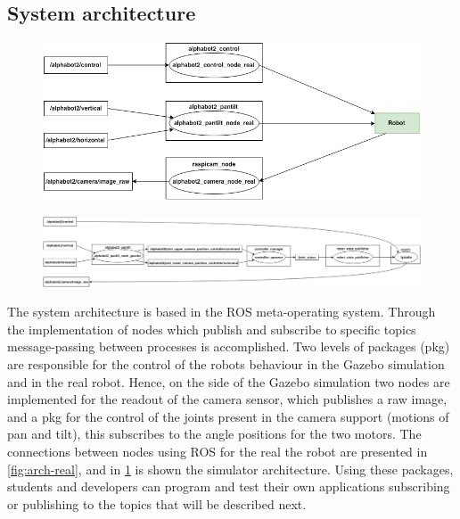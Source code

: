 \documentclass[conference]{IEEEtran}
\begin{document}
\subsection{System architecture} \label{subsec:system_arch}
\begin{figure}
\centering
\begin{minipage}{\linewidth}
  \centering
  \includegraphics[width=0.7\linewidth]{arch-real.png}
  \label{fig:arch-real}
\end{minipage}\newline
\begin{minipage}{\linewidth}
  \centering
  \includegraphics[width=\linewidth]{arch-gazebo.png}
  \label{fig:arch-gazebo}
\end{minipage}
\end{figure}
The system architecture is based in the ROS meta-operating system. Through the implementation of nodes which publish and subscribe to specific topics message-passing between processes is accomplished. Two levels of packages (pkg) are responsible for the control of the robots behaviour in the Gazebo simulation and in the real robot. Hence, on the side of the Gazebo simulation two nodes are implemented for the readout of the camera sensor, which publishes a raw image, and a pkg for the control of the joints present in the camera support (motions of pan and tilt), this subscribes to the angle positions for the two motors. The connections between
nodes using ROS for the real the robot are presented in \cref{fig:arch-real}, and
in \cref{fig:arch-gazebo} is shown the simulator architecture.
Using these packages, students and developers can program and test their own applications subscribing or publishing to the topics that will be described next.
\end{document}
